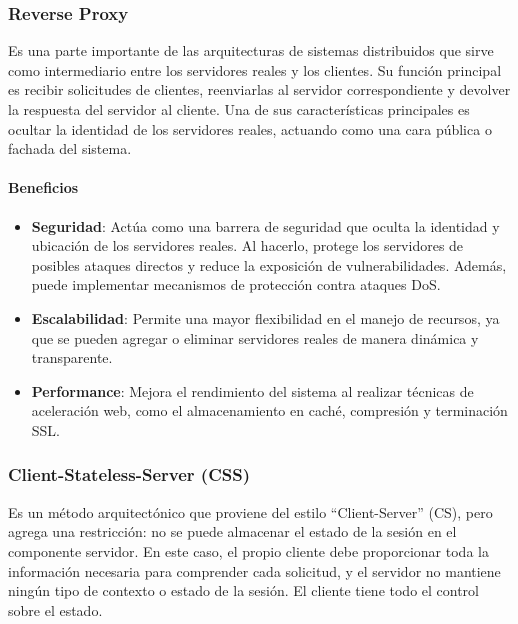 \documentclass{article}
\begin{document}
		
		\subsubsection{Reverse Proxy}
		Es una parte importante de las arquitecturas de sistemas distribuidos que sirve como intermediario entre los servidores reales y los clientes. Su función principal es recibir solicitudes de clientes, reenviarlas al servidor correspondiente y devolver la respuesta del servidor al cliente. Una de sus características principales es ocultar la identidad de los servidores reales, actuando como una cara pública o fachada del sistema.
		
				
		\paragraph{Beneficios}
		\begin{itemize}	
			\item {\textbf{Seguridad}}: Actúa como una barrera de seguridad que oculta la identidad y ubicación de los servidores reales. Al hacerlo, protege los servidores de posibles ataques directos y reduce la exposición de vulnerabilidades. Además, puede implementar mecanismos de protección contra ataques DoS.
			
			\item {\textbf{Escalabilidad}}: Permite una mayor flexibilidad en el manejo de recursos, ya que se pueden agregar o eliminar servidores reales de manera dinámica y transparente.
			
			\item {\textbf{Performance}}: Mejora el rendimiento del sistema al realizar técnicas de aceleración web, como el almacenamiento en caché, compresión y terminación SSL.	
			
		\end{itemize}
		
		\subsubsection{Client-Stateless-Server (CSS)}\label{sec:client-statless-server}
		Es un método arquitectónico que proviene del estilo ``Client-Server'' (CS), pero agrega una restricción: no se puede almacenar el estado de la sesión en el componente servidor. En este caso, el propio cliente debe proporcionar toda la información necesaria para comprender cada solicitud, y el servidor no mantiene ningún tipo de contexto o estado de la sesión. El cliente tiene todo el control sobre el estado.
		
\end{document}
